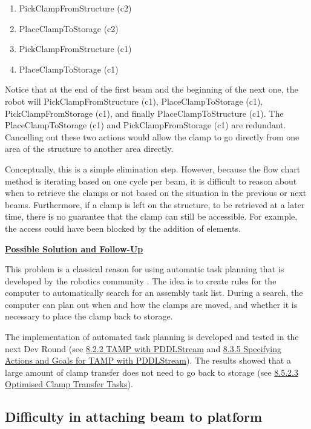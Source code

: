 {\begin{enumerate}
\begin{enumerate}
	\item {\footnotesize PickClampFromStructure (c2)}

	\item {\footnotesize PlaceClampToStorage (c2)}

	\item {\footnotesize PickClampFromStructure (c1)}

	\item {\footnotesize PlaceClampToStorage (c1)}

\end{enumerate}
\end{enumerate}
Notice that at the end of the first beam and the beginning of the next one, the robot will PickClampFromStructure (c1), PlaceClampToStorage (c1), PickClampFromStorage (c1), and finally PlaceClampToStructure (c1). The PlaceClampToStorage (c1) and PickClampFromStorage (c1) are redundant. Cancelling out these two actions would allow the clamp to go directly from one area of the structure to another area directly.

Conceptually, this is a simple elimination step. However, because the flow chart method is iterating based on one cycle per beam, it is difficult to reason about when to retrieve the clamps or not based on the situation in the previous or next beams. Furthermore, if a clamp is left on the structure, to be retrieved at a later time, there is no guarantee that the clamp can still be accessible. For example, the access could have been blocked by the addition of elements. 

\textbf{\ul{Possible Solution and Follow-Up}}

This problem is a classical reason for using automatic task planning that is developed by the robotics community \parencite{ghallabAutomatedPlanningActing2016}. The idea is to create rules for the computer to automatically search for an assembly task list. During a search, the computer can plan out when and how the clamps are moved, and whether it is necessary to place the clamp back to storage. 

The implementation of automated task planning is developed and tested in the next Dev Round (see \ul{8.2.2 TAMP with PDDLStream} and \ul{8.3.5 Specifying Actions and Goals for TAMP with PDDLStream}). The results showed that a large amount of clamp transfer does not need to go back to storage (see \ul{8.5.2.3 Optimised Clamp Transfer Tasks}).

\subsection{Difficulty in attaching beam to platform}

}
